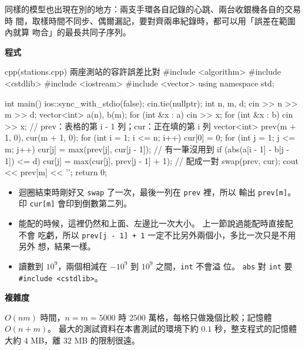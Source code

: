 同樣的模型也出現在別的地方：兩支手環各自記錄的心跳、兩台收銀機各自的交易時
間，取樣時間不同步、偶爾漏記，要對齊兩串紀錄時，都可以用「誤差在範圍內就算
吻合」的最長共同子序列。

\textbf{程式}

\begin{example}[label=ex:ss-stations]{cpp}{(stations.cpp) 兩座測站的容許誤差比對}
#include <algorithm>
#include <cstdlib>
#include <iostream>
#include <vector>
using namespace std;

int main() {
    ios::sync_with_stdio(false);
    cin.tie(nullptr);
    int n, m, d;
    cin >> n >> m >> d;
    vector<int> a(n), b(m);
    for (int &x : a) {
        cin >> x;
    }
    for (int &x : b) {
        cin >> x;
    }
    // prev：表格的第 i - 1 列；cur：正在填的第 i 列
    vector<int> prev(m + 1, 0), cur(m + 1, 0);
    for (int i = 1; i <= n; i++) {
        cur[0] = 0;
        for (int j = 1; j <= m; j++) {
            cur[j] = max(prev[j], cur[j - 1]);       // 有一筆沒用到
            if (abs(a[i - 1] - b[j - 1]) <= d) {
                cur[j] = max(cur[j], prev[j - 1] + 1);   // 配成一對
            }
        }
        swap(prev, cur);
    }
    cout << prev[m] << '\n';
    return 0;
}
\end{example}


\begin{itemize}
\item 迴圈結束時剛好又 \texttt{swap} 了一次，最後一列在 \texttt{prev} 裡，所以
輸出 \texttt{prev[m]}。 印 \texttt{cur[m]} 會印到倒數第二列。
\item 能配的時候，這裡仍然和上面、左邊比一次大小。 上一節說過能配時直接配不會
吃虧，所以 \texttt{prev[j - 1] + 1} 一定不比另外兩個小，多比一次只是不用另外
想，結果一樣。
\item 讀數到 $10^9$，兩個相減在 $-10^9$ 到 $10^9$ 之間，\texttt{int} 不會溢
位。 \texttt{abs} 對 \texttt{int} 要 \texttt{\#include <cstdlib>}。
\end{itemize}

\textbf{複雜度}

$O(nm)$ 時間，$n = m = 5000$ 時 $2500$ 萬格，每格只做幾個比較；記憶體
$O(n + m)$。 最大的測試資料在本書測試的環境下約 $0.1$ 秒，整支程式的記憶體
大約 $4$ MB，離 $32$ MB 的限制很遠。

